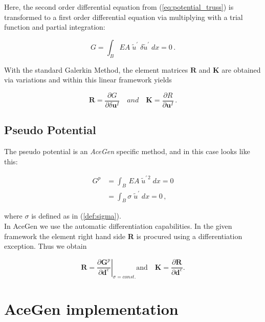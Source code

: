 Here, the second order differential equation  from (\ref{eq:potential_truss}) is transformed 
to a first order differential equation via multiplying with a trial function and partial integration:

\begin{equation}
	G=\displaystyle\int_{B}EA\;\tilde{u}^{\prime}\;\delta\tilde{u}^{\prime}\;dx=0 \, .
	\label{eq:Galerkin}
\end{equation}

With the standard Galerkin Method, the element matrices $\boldsymbol{R}$ and $\boldsymbol{K}$  are obtained via variations 
and within this linear framework yields

\begin{equation}
	\textbf{R}= \dfrac{\partial G}{\partial \delta \boldsymbol{u}^{I}} \quad and \quad \textbf{K}= \dfrac{\partial R}{\partial \boldsymbol{u}^{I}} \, .
\end{equation}

\subsection{Pseudo Potential}

The pseudo potential is an \textit{AceGen
} specific method, and in this case looks like this:

\begin{equation}
	\begin{array}{ll}
		G^{p} & =\displaystyle \int_{B}\, EA\; \tilde{u}^{\prime\,2} \; dx = 0 \\[.8cm]
		      & =\displaystyle \int_{B} \sigma\; \tilde{u}^{\prime}     \;dx=0 \, ,
	\end{array}
	\label{eq:pseudo}
\end{equation}

where $\sigma$ is defined as in (\ref{def:sigma}). \\
In AceGen we use the automatic differentiation capabilities. In the given framework the element right hand side \textbf{R} 
is procured using a differentiation exception. Thus we obtain 

\begin{equation}
	\left.\boldsymbol{R}=\dfrac{\partial \boldsymbol{G}^{p}}{\partial \boldsymbol{d}^{e}}\right|_{\sigma=const.} \text{and} \quad \boldsymbol{K}=\dfrac{\partial\boldsymbol{R}}{\partial\boldsymbol{d}^{e}}.
	\label{eq:pseudoexception}
\end{equation}

\newpage
\section{AceGen implementation}

